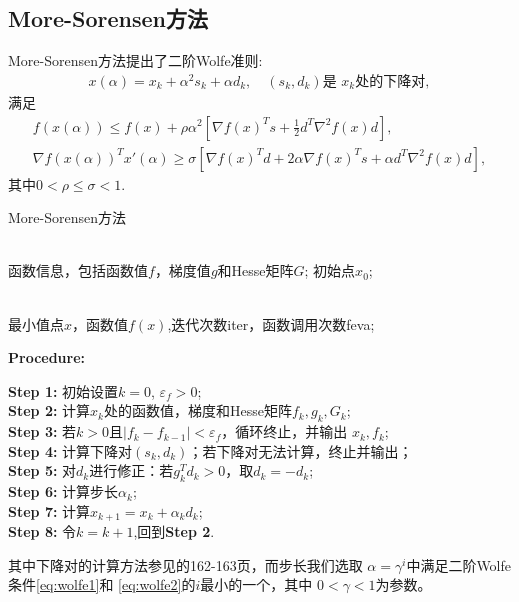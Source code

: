 \documentclass[a4paper,  11pt]{ctexart}
\begin{document}
\subsection{More-Sorensen方法}
More-Sorensen方法提出了二阶Wolfe准则:
\begin{align*}
  x(\alpha)=x_k+\alpha^2s_k+\alpha d_k,\quad (s_k,d_k)\text{是
  }x_k\text{处的下降对},
\end{align*}
满足
\begin{gather}
  \label{eq:wolfe1}
  f(x(\alpha))\leq f(x)+\rho\alpha^2\left[ \nabla f(x)^{T}s+\frac{1}{2}
  d^T\nabla^{2}f(x)d\right],\\
  \label{eq:wolfe2}
  \nabla f(x(\alpha))^Tx'(\alpha)\geq \sigma\left[ \nabla f(x)^Td+
  2\alpha\nabla f(x)^Ts+\alpha d^T\nabla^2f(x)d\right],
\end{gather}
其中$0<\rho\leq\sigma<1$.
\begin{algorithm}[H]
\caption{More-Sorensen方法}
\begin{algorithmic}[2]
\REQUIRE ~~\\
函数信息，包括函数值$f$，梯度值$g$和Hesse矩阵$G$; \quad 初始点$x_0$;

\ENSURE ~~\\
最小值点$x$，函数值$f(x)$,迭代次数iter，函数调用次数feva;

\hspace{-0.65cm}\textbf{Procedure:}

\textbf{Step 1:}  初始设置$k = 0$, $\varepsilon_f>0$; \\
\textbf{Step 2:}  计算$x_k$处的函数值，梯度和Hesse矩阵$f_k,g_k,G_k$; \\
\textbf{Step 3:}  若$k>0$且$|f_{k}-f_{k-1}|<\varepsilon_f$，循环终止，并输出
$x_k,f_k$;\\
\textbf{Step 4:}  计算下降对$(s_k,d_k)$；若下降对无法计算，终止并输出；\\
\textbf{Step 5:}  对$d_k$进行修正：若$g_k^Td_k>0$，取$d_k=-d_k$;\\
\textbf{Step 6:}  计算步长$\alpha_k$;\\
\textbf{Step 7:}  计算$x_{k+1}=x_k+\alpha_kd_k$; \\
\textbf{Step 8:}  令$k=k+1$,回到\textbf{Step 2}.
\end{algorithmic}
\end{algorithm}
其中下降对的计算方法参见\cite{article1}的162-163页，而步长我们选取
$\alpha=\gamma^i$中满足二阶Wolfe条件\eqref{eq:wolfe1}和
\eqref{eq:wolfe2}的$i$最小的一个，其中
$0<\gamma<1$为参数。
\end{document}
